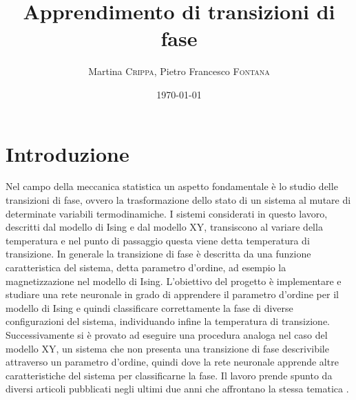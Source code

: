 \documentclass{article}
\title{Apprendimento di transizioni di fase} %
\author{Martina \textsc{Crippa}, Pietro Francesco \textsc{Fontana}} %
\date{\today} %
\begin{document}
\maketitle %




\section{Introduzione}
Nel campo della meccanica statistica un aspetto fondamentale è lo studio delle transizioni di fase, ovvero la trasformazione dello stato di un sistema al mutare di determinate variabili termodinamiche.
I sistemi considerati in questo lavoro, descritti dal modello di Ising e dal modello XY, transiscono al variare della temperatura e nel punto di passaggio questa viene detta temperatura di transizione.
In generale la transizione di fase è descritta da una funzione caratteristica del sistema, detta parametro d'ordine, ad esempio la magnetizzazione nel modello di Ising.
L'obiettivo del progetto è implementare e studiare una rete neuronale in grado di apprendere il parametro d'ordine per il modello di Ising e quindi classificare correttamente la fase di diverse configurazioni del sistema, individuando infine la temperatura di transizione.
Successivamente si è provato ad eseguire una procedura analoga nel caso del modello XY, un sistema che non presenta una transizione di fase descrivibile attraverso un parametro d'ordine, quindi dove la rete neuronale apprende altre caratteristiche del sistema per classificarne la fase.
Il lavoro prende spunto da diversi articoli pubblicati negli ultimi due anni che affrontano la stessa tematica \cite{carrasqu,melko,wessel}.
\end{document}
